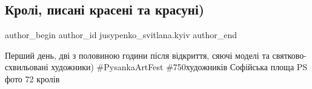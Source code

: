  
 
 
 
 
 
\subsection{Кролі, писані красені та красуні)}
\label{sec:05_04_2018.fb.jusypenko_svitlana.kyiv.1.kroli_pysani_kraseni_ta_krasuni}
 
\ifcmt
 author_begin
   author_id jusypenko_svitlana.kyiv
 author_end
\fi

Перший день, дві з половиною години після відкриття, сяючі моделі та
святково-схвильовані художники) \#PysankaArtFest \#750художників Софійська площа
PS фото 72 кролів





